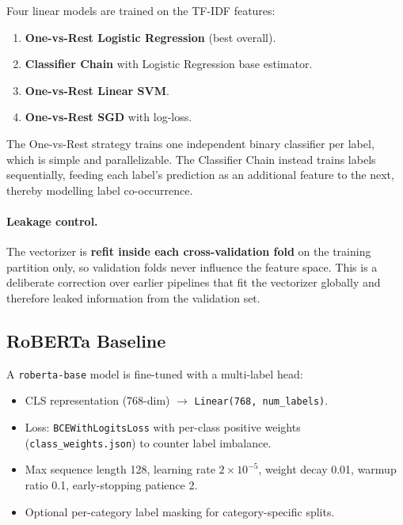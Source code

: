 \documentclass[11pt,a4paper]{article}
\begin{document}
Four linear models are trained on the TF-IDF features:

\begin{enumerate}[nosep]
    \item \textbf{One-vs-Rest Logistic Regression} (best overall).
    \item \textbf{Classifier Chain} with Logistic Regression base estimator.
    \item \textbf{One-vs-Rest Linear SVM}.
    \item \textbf{One-vs-Rest SGD} with log-loss.
\end{enumerate}

The One-vs-Rest strategy trains one independent binary classifier per label,
which is simple and parallelizable. The Classifier Chain instead trains labels
sequentially, feeding each label's prediction as an additional feature to the
next, thereby modelling label co-occurrence.

\paragraph{Leakage control.}
The vectorizer is \textbf{refit inside each cross-validation fold} on the
training partition only, so validation folds never influence the feature space.
This is a deliberate correction over earlier pipelines that fit the vectorizer
globally and therefore leaked information from the validation set.

\subsection{RoBERTa Baseline}

A \texttt{roberta-base} model is fine-tuned with a multi-label head:

\begin{itemize}[nosep]
    \item CLS representation (768-dim) $\rightarrow$
          \texttt{Linear(768, num\_labels)}.
    \item Loss: \texttt{BCEWithLogitsLoss} with per-class positive weights
          (\texttt{class\_weights.json}) to counter label imbalance.
    \item Max sequence length 128, learning rate $2\times10^{-5}$, weight decay
          0.01, warmup ratio 0.1, early-stopping patience 2.
    \item Optional per-category label masking for category-specific splits.
\end{itemize}
\end{document}
